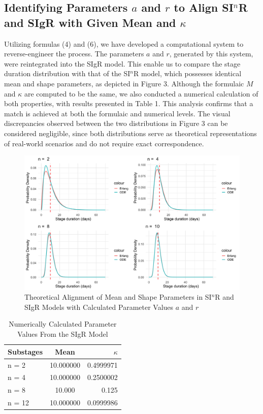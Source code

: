 \documentclass[12pt]{article}
\begin{document}
\subsection{Identifying Parameters $a$ and $r$ to Align SI$^n$R and SIgR with Given Mean and $\kappa$}
Utilizing formulas (4) and (6), we have developed a computational system to reverse-engineer the process. The parameters $a$ and $r$, generated by this system, were reintegrated into the SIgR model. This enable us to compare the stage duration distribution with that of the SI$^n$R model, which possesses identical mean and shape parameters, as depicted in Figure 3. Although the formulaic $M$ and $\kappa$ are computed to be the same, we also conducted a numerical calculation of both properties, with results presented in Table 1. This analysis confirms that a match is achieved at both the formulaic and numerical levels. The visual discrepancies observed between the two distributions in Figure 3 can be considered negligible, since both distributions serve as theoretical representations of real-world scenarios and do not require exact correspondence.
\begin{figure}[h]
    \centering
    \includegraphics[width= \textwidth]{4.3.1.png}
    \caption{Theoretical Alignment of Mean and Shape Parameters in SI$^n$R and SIgR Models with Calculated Parameter Values $a$ and $r$}
\end{figure}

\begin{table}[h!]
    \centering
    \begin{tabular}{ l | c | r }
      \hline
      Substages & Mean & $\kappa$ \\
      \hline
      n = 2 & 10.000000 & 0.4999971 \\
      n = 4 & 10.000000 & 0.2500002 \\
      n = 8 & 10.000 & 0.125 \\
      n = 12 & 10.000000 & 0.0999986 \\
      \hline
    \end{tabular}
    \caption{Numerically Calculated Parameter Values From the SIgR Model}
\end{table}
\end{document}
